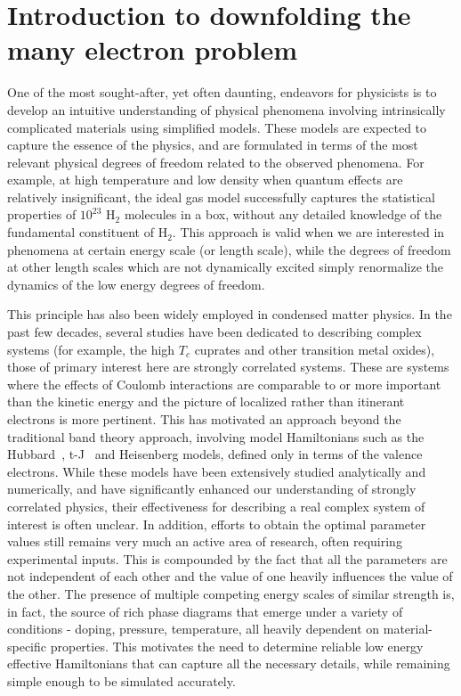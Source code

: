 \documentclass[prl,12pt,onecolumn,nofootinbib,notitlepage,english,superscriptaddress]{revtex4-1}
\begin{document}
\section{Introduction to downfolding the many electron problem}

One of the most sought-after, yet often daunting, endeavors for physicists is to develop 
an intuitive understanding of physical phenomena involving intrinsically complicated materials 
using simplified models. These models are expected to capture the essence of the physics, and are formulated in terms 
of the most relevant physical degrees of freedom related to the observed phenomena. 
For example, at high temperature and low density when quantum effects are relatively insignificant, the ideal gas model 
successfully captures the statistical properties of $10^{23}$ H$_{2}$ molecules in a box, 
without any detailed knowledge of the fundamental constituent of H$_{2}$. This approach is valid when we are interested in 
phenomena at certain energy scale (or length scale), while the degrees of freedom at other length scales which are not 
dynamically excited simply renormalize the dynamics of the low energy degrees of freedom. 

This principle has also been widely employed in condensed matter physics. In the past few decades, several studies 
have been dedicated to describing complex systems (for example, the high $T_c$ cuprates and other transition metal oxides), those of 
primary interest here are strongly correlated systems. These are systems where the effects of Coulomb 
interactions are comparable to or more important than the kinetic energy and the picture of 
localized rather than itinerant electrons is more pertinent. This has motivated an approach beyond the 
traditional band theory approach, involving model Hamiltonians such as the Hubbard~\cite{Hubbard}, t-J~\cite{tJSpalek} 
and Heisenberg models, defined only in terms of the valence electrons. 
While these models have been extensively studied analytically and numerically, and have significantly 
enhanced our understanding of strongly correlated physics, their effectiveness 
for describing a real complex system of interest is often unclear. In addition, efforts to obtain the 
optimal parameter values still remains very much an active area of research, often requiring experimental inputs. 
This is compounded by the fact that all the parameters are not independent of each other and 
the value of one heavily influences the value of the other. The presence of multiple competing energy scales of similar strength 
is, in fact, the source of rich phase diagrams that 
emerge under a variety of conditions - doping, pressure, 
temperature, all heavily dependent on material-specific properties. This motivates 
the need to determine reliable low energy effective Hamiltonians that can capture all the necessary details, while 
remaining simple enough to be simulated accurately.  
\end{document}
